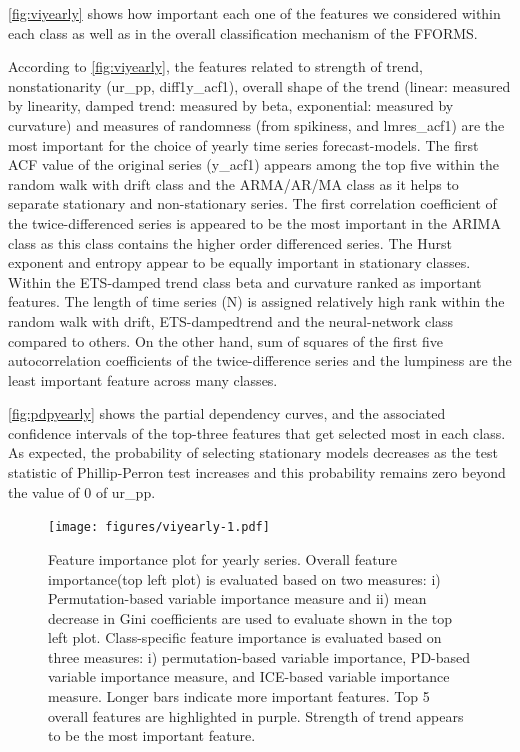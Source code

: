 \documentclass[11pt,a4paper,]{article}
\begin{document}
\autoref{fig:viyearly} shows how important each one of the features we
considered within each class as well as in the overall classification
mechanism of the FFORMS.

According to \autoref{fig:viyearly}, the features related to strength of
trend, nonstationarity (ur\_pp, diff1y\_acf1), overall shape of the
trend (linear: measured by linearity, damped trend: measured by beta,
exponential: measured by curvature) and measures of randomness (from
spikiness, and lmres\_acf1) are the most important for the choice of
yearly time series forecast-models. The first ACF value of the original
series (y\_acf1) appears among the top five within the random walk with
drift class and the ARMA/AR/MA class as it helps to separate stationary
and non-stationary series. The first correlation coefficient of the
twice-differenced series is appeared to be the most important in the
ARIMA class as this class contains the higher order differenced series.
The Hurst exponent and entropy appear to be equally important in
stationary classes. Within the ETS-damped trend class beta and curvature
ranked as important features. The length of time series (N) is assigned
relatively high rank within the random walk with drift, ETS-dampedtrend
and the neural-network class compared to others. On the other hand, sum
of squares of the first five autocorrelation coefficients of the
twice-difference series and the lumpiness are the least important
feature across many classes.

\autoref{fig:pdpyearly} shows the partial dependency curves, and the
associated confidence intervals of the top-three features that get
selected most in each class. As expected, the probability of selecting
stationary models decreases as the test statistic of Phillip-Perron test
increases and this probability remains zero beyond the value of 0 of
ur\_pp.

\begin{figure}
\centering
\texttt{[image: figures/viyearly-1.pdf]}
\caption{\label{fig:viyearly}Feature importance plot for yearly series.
Overall feature importance(top left plot) is evaluated based on two
measures: i) Permutation-based variable importance measure and ii) mean
decrease in Gini coefficients are used to evaluate shown in the top left
plot. Class-specific feature importance is evaluated based on three
measures: i) permutation-based variable importance, PD-based variable
importance measure, and ICE-based variable importance measure. Longer
bars indicate more important features. Top 5 overall features are
highlighted in purple. Strength of trend appears to be the most
important feature.}
\end{figure}
\end{document}
